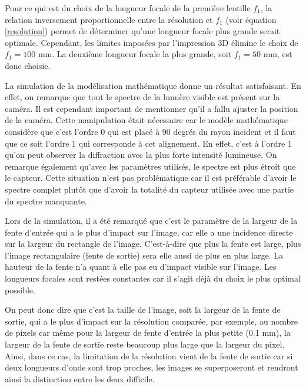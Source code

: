 \documentclass[conference]{IEEEtran}
\begin{document}
Pour ce qui est du choix de la longueur focale de la première lentille $f_1$, la relation inversement proportionnelle
entre la résolution et $f_1$ (voir équation \ref{resolution}) permet de déterminer qu'une longueur focale plus grande serait optimale. Cependant,
les limites imposées par l'impression 3D élimine le choix de $f_1=100$ mm. La deuxième longueur focale la plus grande, soit $f_1=50$ mm,
est donc choisie.

La simulation de la modélisation mathématique donne un résultat satisfaisant. En effet, on remarque que tout le spectre
de la lumière visible est présent sur la caméra. Il est cependant important de mentionner qu'il a fallu ajuster la
position de la caméra. Cette manipulation était nécessaire car le modèle mathématique considère que c'est l'ordre 0 qui est placé à 90 degrés du rayon
incident et il faut que ce soit l'ordre 1 qui corresponde à cet alignement. En effet, c'est à l'ordre 1 qu'on peut observer
la diffraction avec la plus forte intensité lumineuse. On remarque également qu'avec les paramètres utilisés, le spectre est plus étroit
que le capteur. Cette situation n'est pas problématique car il est préférable d'avoir le spectre complet plutôt que d'avoir la totalité du capteur utilisée
avec une partie du spectre manquante.

Lors de la simulation, il a été remarqué que c'est le paramètre de la largeur de la fente d'entrée qui a le plus d'impact sur l'image,
car elle a une incidence directe sur la largeur du rectangle de l'image. C'est-à-dire que plus la fente est large, plus
l'image rectangulaire (fente de sortie) sera elle aussi de plus en plus large. La hauteur de la fente n'a quant à elle pas eu d'impact
visible sur l'image. Les longueurs focales sont restées constantes car il s'agit déjà du choix le plus optimal possible.

On peut donc dire que c'est la taille de l'image, soit la largeur de la fente de sortie, qui a le plus d'impact sur la résolution comparée, par exemple, au nombre de pixels
car même pour la largeur de fente d'entrée la plus petite (0.1 mm), la largeur de la fente de sortie reste beaucoup plus large que la largeur du pixel.
Ainsi, dans ce cas, la limitation de la résolution vient de la fente de sortie car si deux longueurs d'onde sont trop proches, les images se superposeront
et rendront ainsi la distinction entre les deux difficile.
\end{document}
